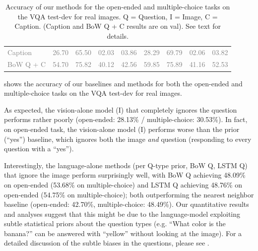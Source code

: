 \begin{table}[t]
\begin{center}
\begin{tabular}{@{} l  c  c  c  c  c  c c c@{}}
\midrule
\textcolor{gray}{Caption} & \textcolor{gray}{26.70} & \textcolor{gray}{65.50} & \textcolor{gray}{02.03} & \textcolor{gray}{03.86} 
& \textcolor{gray}{28.29} & \textcolor{gray}{69.79} & \textcolor{gray}{02.06} & \textcolor{gray}{03.82}\\
\textcolor{gray}{BoW Q + C} & \textcolor{gray}{54.70} & \textcolor{gray}{75.82} & \textcolor{gray}{40.12} & \textcolor{gray}{42.56} 
& \textcolor{gray}{59.85} & \textcolor{gray}{75.89} & \textcolor{gray}{41.16}  & \textcolor{gray}{52.53}\\
\bottomrule
\end{tabular}	
\caption{Accuracy of our methods for the open-ended and multiple-choice tasks on the VQA test-dev for real images. 
Q = Question, I = Image, C = Caption. (Caption and BoW Q + C results are on val). 
See text for details.
}
\label{tab:acc}
\end{center}
\end{table}
 shows the accuracy of our baselines and methods for both the open-ended and multiple-choice tasks on the VQA test-dev for real images.

As expected, the vision-alone model (I) that completely ignores the question performs rather poorly (open-ended: 28.13\% / multiple-choice: 30.53\%). In fact, on open-ended task, the vision-alone model (I) performs worse than the prior (``yes'') baseline, which ignores both the image \emph{and} question (responding to every question with a ``yes''). 

Interestingly, the language-alone methods (per Q-type prior, BoW Q, LSTM Q) that ignore the image perform surprisingly well, with BoW Q achieving 48.09\% on open-ended (53.68\% on multiple-choice) and LSTM Q achieving 48.76\% on open-ended (54.75\% on multiple-choice); both outperforming the nearest neighbor baseline (open-ended: 42.70\%, multiple-choice: 48.49\%). Our quantitative results and analyses suggest that this might be due to the language-model exploiting subtle statistical priors about the question types (e.g. ``What color is the banana?'' can be answered with ``yellow'' without looking at the image). For a detailed discussion of the subtle biases in the questions, please see \cite{yinyang}. 

